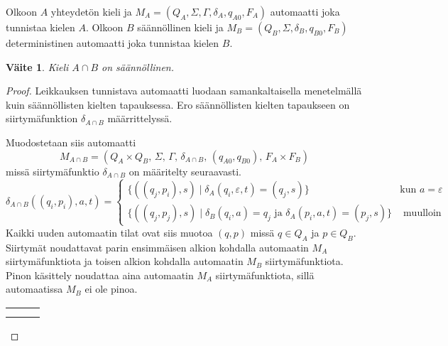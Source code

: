 \documentclass[a4paper,11pt, draft]{article}
\newtheorem*{claim}{Väite}
\newcommand{\ve}{\varepsilon}
\newenvironment{automata}[1][2.8]%
{\begin{tikzpicture}[->,>=stealth',shorten >=1pt,auto,node distance=#1cm,semithick]}%
{\end{tikzpicture}}
\begin{document}
\begin{enumerate}
\begin{enumerate}
      Olkoon $A$ yhteydetön kieli ja $M_A = (Q_A, \Sigma, \Gamma, \delta_A,
      q_{A0}, F_A)$ automaatti joka tunnistaa kielen $A$. Olkoon $B$
      säännöllinen kieli ja $M_B = (Q_B, \Sigma, \delta_B, q_{B0}, F_B)$
      deterministinen automaatti joka tunnistaa kielen $B$.
      \begin{claim}
         Kieli $A \cap B$ on säännöllinen.
      \end{claim}
      \begin{proof}
        Leikkauksen tunnistava automaatti luodaan samankaltaisella
        menetelmällä kuin säännöllisten kielten tapauksessa. Ero säännöllisten
        kielten tapaukseen on siirtymäfunktion $\delta_{A \cap B}$
        määrrittelyssä.

        Muodostetaan siis automaatti
        \begin{equation*}
          M_{A \cap B} = (Q_A \times Q_B \text{, } \Sigma \text{, } \Gamma
          \text{, } \delta_{A \cap B} \text{, } (q_{A0}, q_{B0}) \text{, } F_A
          \times F_B)
        \end{equation*}
        missä siirtymäfunktio $\delta_{A \cap B}$ on määritelty seuraavasti.
%
        \begin{equation*}
          \delta_{A \cap B}((q_i, p_i), a, t) = 
          \begin{cases}
            \{((q_j, p_i),s) \mid \delta_A(q_i, \ve, t) = (q_j, s)\} & \text{
              kun } a = \ve \\

            \{((q_j, p_j),s) \mid \delta_B(q_i, a) = q_j \text{ ja }
            \delta_A(p_i, a, t) = (p_j, s)\} & \text{ muulloin}
          \end{cases}
        \end{equation*}
%
        Kaikki uuden automaatin tilat ovat siis muotoa $(q, p)$ missä $q \in
        Q_A$ ja $p \in Q_B$. Siirtymät noudattavat parin ensimmäisen alkion
        kohdalla automaatin $M_A$ siirtymäfunktiota ja toisen alkion kohdalla
        automaatin $M_B$ siirtymäfunktiota. Pinon käsittely noudattaa aina
        automaatin $M_A$ siirtymäfunktiota, sillä automaatissa $M_B$ ei ole
        pinoa.
%
        \begin{center}
\end{center}
\end{proof}
\end{enumerate}
\end{enumerate}
\end{document}
